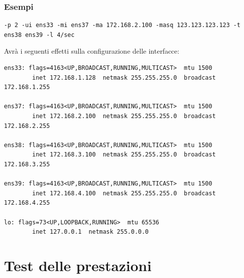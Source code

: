 \documentclass{beamer}
\begin{document}
\begin{frame}[fragile]
    \frametitle{Esempi}
    \begin{lstlisting}
-p 2 -ui ens33 -mi ens37 -ma 172.168.2.100 -masq 123.123.123.123 -t ens38 ens39 -l 4/sec

            \end{lstlisting}
    Avrà i seguenti effetti sulla configurazione delle interfacce:
    \begin{lstlisting}
ens33: flags=4163<UP,BROADCAST,RUNNING,MULTICAST>  mtu 1500
        inet 172.168.1.128  netmask 255.255.255.0  broadcast 172.168.1.255

ens37: flags=4163<UP,BROADCAST,RUNNING,MULTICAST>  mtu 1500
        inet 172.168.2.100  netmask 255.255.255.0  broadcast 172.168.2.255

ens38: flags=4163<UP,BROADCAST,RUNNING,MULTICAST>  mtu 1500
        inet 172.168.3.100  netmask 255.255.255.0  broadcast 172.168.3.255

ens39: flags=4163<UP,BROADCAST,RUNNING,MULTICAST>  mtu 1500
        inet 172.168.4.100  netmask 255.255.255.0  broadcast 172.168.4.255

lo: flags=73<UP,LOOPBACK,RUNNING>  mtu 65536
        inet 127.0.0.1  netmask 255.0.0.0
    \end{lstlisting}
\end{frame}

\section{Test delle prestazioni}

    

\end{document}
